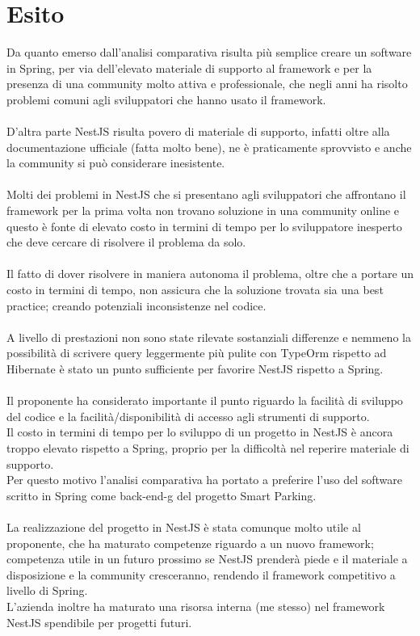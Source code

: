 \section{Esito}
Da quanto emerso dall'analisi comparativa risulta più semplice creare un software in Spring, per via dell'elevato materiale di
supporto al framework e per la presenza di una community molto attiva e professionale, che negli
anni ha risolto problemi comuni agli sviluppatori che hanno usato il framework. 
\\\\
D'altra parte NestJS risulta povero di materiale di supporto, infatti oltre alla documentazione ufficiale (fatta molto
bene), ne è praticamente sprovvisto e anche la community si può considerare inesistente.
\\\\
Molti dei problemi in NestJS che si presentano agli sviluppatori che affrontano il framework per la prima volta non
trovano soluzione in una community online e questo è fonte di elevato costo in termini di tempo per lo sviluppatore 
inesperto che deve cercare di risolvere il problema da solo.
\\\\
Il fatto di dover risolvere in maniera autonoma il problema, oltre che a portare un costo in termini di tempo, non assicura 
che la soluzione trovata sia una best practice; creando potenziali inconsistenze nel codice.
\\\\
A livello di prestazioni non sono state rilevate sostanziali differenze e nemmeno la possibilità di scrivere query 
leggermente più pulite con TypeOrm rispetto ad Hibernate è stato un punto sufficiente per favorire 
NestJS rispetto a Spring.
\\\\
Il proponente ha considerato importante il punto riguardo la facilità di sviluppo del codice
e la facilità/disponibilità di accesso agli strumenti di supporto.
\\
Il costo in termini di tempo per lo sviluppo di un progetto in NestJS è ancora troppo elevato rispetto a Spring, proprio
per la difficoltà nel reperire materiale di supporto.
\\
Per questo motivo l'analisi comparativa ha portato a preferire l'uso del software scritto in Spring come \gls{back-end-g}
del progetto Smart Parking.
\\\\
La realizzazione del progetto in NestJS è stata comunque molto utile al proponente, che ha maturato competenze riguardo a un nuovo
framework; competenza utile in un futuro prossimo se NestJS prenderà piede e il materiale a 
disposizione e la community cresceranno, rendendo il framework competitivo a livello di Spring.
\\
L'azienda inoltre ha maturato una risorsa interna (me stesso) nel framework NestJS spendibile
per progetti futuri. 